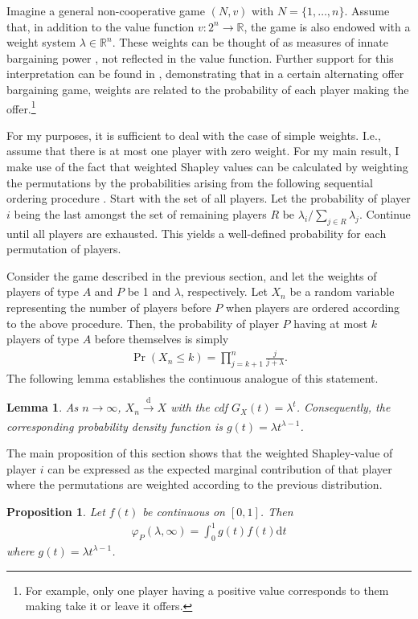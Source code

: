 \documentclass[a4paper]{article}
\newtheorem{proposition}{Proposition}
\newtheorem{lemma}{Lemma}
\newcommand{\dt}{\mathrm{d}t}
\begin{document}
Imagine a general non-cooperative game $(N, v)$ with $N = \{1, \dots, n\}$.
Assume that, in addition to the value function $v : 2^n \to \mathbb{R}$, the game is also endowed with a weight system $\lambda \in \mathbb{R}^n$.
These weights can be thought of as measures of innate bargaining power \parencite{shapley1953additive}, not reflected in the value function.
Further support for this interpretation can be found in \textcite{hart1996bargaining}, demonstrating that in a certain alternating offer bargaining game, weights are related to the probability of each player making the offer.\footnote{
    For example, only one player having a positive value corresponds to them making take it or leave it offers.
}

For my purposes, it is sufficient to deal with the case of simple weights. I.e., assume that there is at most one player with zero weight.
For my main result, I make use of the fact that weighted Shapley values can be calculated by weighting the permutations by the probabilities arising from the following sequential ordering procedure \parencite{kalai1987weighted}.
Start with the set of all players.
Let the probability of player $i$ being the last amongst the set of remaining players $R$ be $\lambda_i / \sum_{j \in R} \lambda_j$.
Continue until all players are exhausted.
This yields a well-defined probability for each permutation of players.

Consider the game described in the previous section, and let the weights of players of type $A$ and $P$ be 1 and $\lambda$, respectively.
Let $X_n$ be a random variable representing the number of players before $P$ when players are ordered according to the above procedure.
Then, the probability of player $P$ having at most $k$ players of type $A$ before themselves is simply
\begin{align*}
    \Pr(X_n \leq k) = \prod_{j=k+1}^n \frac{j}{j + \lambda} .
\end{align*}
The following lemma establishes the continuous analogue of this statement.
\begin{lemma}
    \label{lem:entry_distr}
     As $n \to \infty$, $X_n \xrightarrow[]{\mathrm{d}} X$ with the cdf $G_X(t) = \lambda^t$.
     Consequently, the corresponding probability density function is $g(t) = \lambda t^{\lambda - 1}$.
\end{lemma}

The main proposition of this section shows that the weighted Shapley-value of player $i$ can be expressed as the expected marginal contribution of that player where the permutations are weighted according to the previous distribution.
\begin{proposition}
    \label{prop:one_sided_weighted}
    Let $f(t)$ be continuous on $[0, 1]$. Then
    \begin{align*}
        \varphi_P(\lambda, \infty) = \int_0^1 g(t) f(t) \dt
    \end{align*}
    where $g(t) = \lambda t^{\lambda - 1}$.
\end{proposition}
\end{document}
